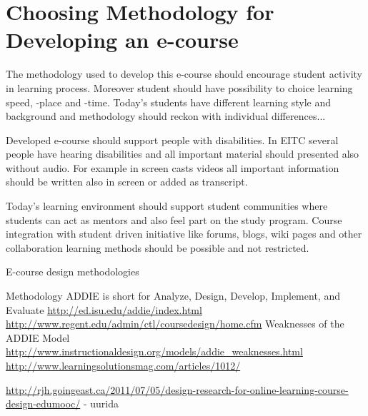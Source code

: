 \section{Choosing Methodology for Developing an e-course}



The methodology used to develop this e-course should encourage student activity in learning process. Moreover student should have possibility to choice learning speed, -place and -time. Today's students have different learning style and background and methodology should reckon with individual differences...

Developed e-course should support people with disabilities. In \gls{EITC} several people have hearing disabilities and all important material should presented also without audio. For example in screen casts videos all important information should be written also in screen or added as transcript.

Today’s learning environment should support student communities where students can act as mentors and also feel part on the study program. Course integration with student driven initiative like forums, blogs, wiki pages and other collaboration learning methods should be possible and not restricted.

E-course design methodologies

Methodology 
ADDIE is short for Analyze, Design, Develop, Implement, and Evaluate \url{http://ed.isu.edu/addie/index.html}
\url{http://www.regent.edu/admin/ctl/coursedesign/home.cfm}
Weaknesses of the ADDIE Model \url{http://www.instructionaldesign.org/models/addie_weaknesses.html}
\url{http://www.learningsolutionsmag.com/articles/1012/}

\url{http://rjh.goingeast.ca/2011/07/05/design-research-for-online-learning-course-design-edumooc/} - uurida

